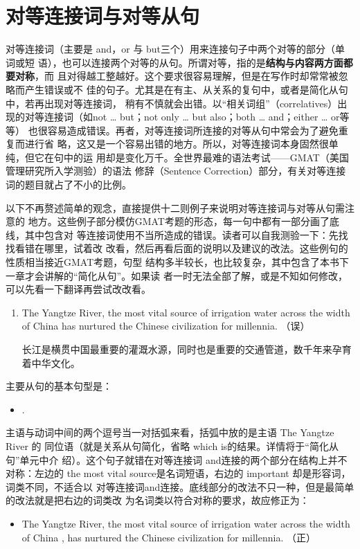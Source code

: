 \chapter{对等连接词与对等从句}

对等连接词（主要是 and，or 与 but三个）用来连接句子中两个对等的部分（单词或短
语），也可以连接两个对等的从句。所谓对等，指的是\textbf{结构与内容两方面都要对称}，而
且对得越工整越好。这个要求很容易理解，但是在写作时却常常被忽略而产生错误或不
佳的句子。尤其是在有主、从关系的复句中，或者是简化从句中，若再出现对等连接词，
稍有不慎就会出错。以“相关词组”（correlatives）出现的对等连接词（如not
\ldots{} but；not only \ldots{} but also；both \ldots{} and；either \ldots{} or等等）
也很容易造成错误。再者，对等连接词所连接的对等从句中常会为了避免重复而进行省
略，这又是一个容易出错的地方。所以，对等连接词本身固然很单纯，但它在句中的运
用却是变化万千。全世界最难的语法考试——GMAT（美国管理研究所入学测验）的语法
修辞（Sentence Correction）部分，有关对等连接词的题目就占了不小的比例。

以下不再赘述简单的观念，直接提供十二则例子来说明对等连接词与对等从句需注意的
地方。这些例子部分模仿GMAT考题的形态，每一句中都有一部分画了底线，其中包含对
等连接词使用不当所造成的错误。读者可以自我测验一下：先找找看错在哪里，试着改
改看，然后再看后面的说明以及建议的改法。这些例句的性质相当接近GMAT考题，句型
结构多半较长，也比较复杂，其中包含了本书下一章才会讲解的“简化从句”。如果读
者一时无法全部了解，或是不知如何修改，可以先看一下翻译再尝试改改看。

\begin{enumerate}
\item The Yangtze River, the most vital source of irrigation water across the
  width of China  has
  nurtured the Chinese civilization for millennia. （误）


  长江是横贯中国最重要的灌溉水源，同时也是重要的交通管道，数千年来孕育着中华文化。
\end{enumerate}


主要从句的基本句型是：
\begin{itemize}
\item {}  .
\end{itemize}

主语与动词中间的两个逗号当一对括弧来看，括弧中放的是主语 The Yangtze River 的
同位语（就是关系从句简化，省略 which is的结果。详情将于“简化从句”单元中介
绍）。这个句子就错在对等连接词 and连接的两个部分在结构上并不对称：左边的 the
most vital source是名词短语，右边的 important 却是形容词，词类不同，不适合以
对等连接词and连接。底线部分的改法不只一种，但是最简单的改法就是把右边的词类改
为名词类以符合对称的要求，故应修正为：
\begin{mybox}
\begin{itemize}
\item The Yangtze River, the most vital source of irrigation water across the
  width of China , has nurtured the
  Chinese civilization for millennia. （正）
\end{itemize}
\end{mybox}

